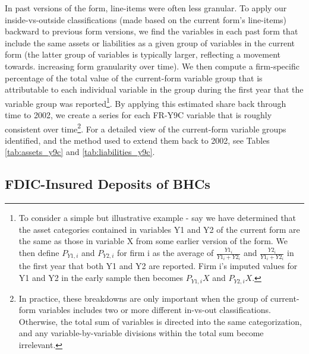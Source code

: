 In past versions of the form, line-items were often less granular. To apply our inside-vs-outside classifications (made based on the current form's line-items) backward to previous form versions, we find the variables in each past form that include the same assets or liabilities as a given group of variables in the current form (the latter group of variables is typically larger, reflecting a movement towards. increasing form granularity over time). We then compute a firm-specific percentage of the total value of the current-form variable group that is attributable to each individual variable in the group during the first year that the variable group was reported\footnote{To consider a simple but illustrative example - say we have determined that the asset categories contained in variables Y1 and Y2 of the current form are the same as those in variable X from some earlier version of the form. We then define $P_{Y1,i}$ and $P_{Y2, i}$ for firm i as the average of $\frac{Y1_i}{Y1_i+Y2_i}$ and $\frac{Y2_i}{Y1_i+Y2_i}$ in the first year that both Y1 and Y2 are reported. Firm i's imputed values for Y1 and Y2 in the early sample then becomes $P_{Y1,i}X$ and $P_{Y2, i}X$.}. By applying this estimated share back through time to 2002, we create a series for each FR-Y9C variable that is roughly consistent over time\footnote{In practice, these breakdowns are only important when the group of current-form variables includes two or more different in-vs-out classifications. Otherwise, the total sum of variables is directed into the same categorization, and any variable-by-variable divisions within the total sum become irrelevant.}. For a detailed view of the current-form variable groups identified, and the method used to extend them back to 2002, see Tables \ref{tab:assets_y9c} and \ref{tab:liabilities_y9c}.

\subsection{FDIC-Insured Deposits of BHCs}\label{subsec:Deposits}

